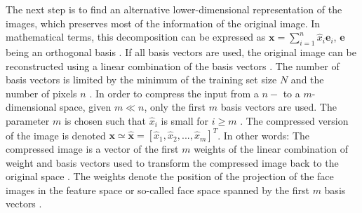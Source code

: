 The next step is to find an alternative lower-dimensional representation of the images, which preserves most of the information of the original image.
In mathematical terms, this decomposition can be expressed as 
$\textbf{x} = \sum_{i=1}^{n}\hat{x}_{i} \textbf{e}_{i}$, 
$\textbf{e}$ being an orthogonal basis 
\cite{eigenfaces1997}.
If all basis vectors are used, the original image can be reconstructed using a linear combination of the basis vectors \cite{eigenfaces1991, face-recognition2020}.
The number of basis vectors is limited by the minimum of the training set size $N$ \cite{eigenfaces1991} and the number of pixels $n$ \cite{face-recognition2020}.
In order to compress the input from a $n-$ to a $m$-dimensional space, given $m \ll n$, only the first $m$ basis vectors are used.
The parameter $m$ is chosen such that $\hat{x}_{i}$ is small for $i \ge m$ \cite{eigenfaces1997}.
The compressed version of the image is denoted $\textbf{x} \simeq \hat{\textbf{x}} = \left[\hat{x}_{1}, \hat{x}_{2}, ..., \hat{x}_{m}  \right]^{T}$.
In other words: 
The compressed image is a vector of the first $m$ weights of the linear combination of weight and basis vectors used to transform the compressed image back to the original space \cite{eigenfaces1991}.
The weights denote the position of the projection of the face images in the feature space or so-called face space spanned by the first $m$ basis vectors \cite{eigenfaces1991}.

